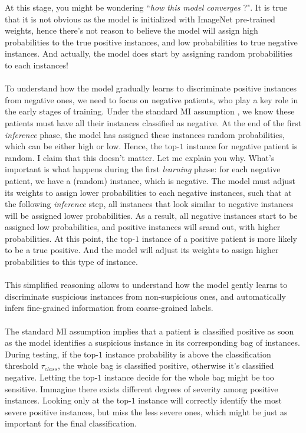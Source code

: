 \documentclass[final]{cvpr}
\begin{document}
	\noindent
	 At this stage, you might be wondering ``\textit{how this model converges} ?". It is true that it is not obvious as the model is initialized with ImageNet pre-trained weights, hence there's not reason to believe the model will assign high probabilities to the true positive instances, and low probabilities to true negative instances. And actually, the model does start by assigning random probabilities to each instances!  \\
	 \\
	 To understand how the model gradually learns to discriminate positive instances from negative ones, we need to focus on negative patients, who play a key role in the early stages of training. Under the standard MI assumption , we know these patients must have all their instances classified as negative. At the end of the first \textit{inference} phase, the model has assigned these instances random probabilities, which can be either high or low. Hence, the top-$1$ instance for negative patient is random. I claim that this doesn't matter. Let me explain you why. What's important is what happens during the first \textit{learning} phase: for each negative patient, we have a (random) instance, which is negative. The model must adjust its weights to assign lower probabilities to each negative instances, such that at the following \textit{inference} step, all instances that look similar to negative instances will be assigned lower probabilities. As a result, all negative instances start to be assigned low probabilities, and positive instances will srand out, with higher probabilities. At this point, the top-$1$ instance of a positive patient is more likely to be a true positive. And the model will adjust its weights to assign higher probabilities to this type of instance.\\
	 \\
	 This simplified reasoning allows to understand	how the model gently learns to discriminate suspicious instances from non-suspicious ones, and automatically infers fine-grained information from coarse-grained labels.\\
	 \\
	The standard MI assumption implies that a patient is classified positive as soon as the model identifies a suspicious instance in its corresponding bag of instances. During testing, if the top-$1$ instance probability is above the classification threshold $\tau_{class}$, the whole bag is classified positive, otherwise it's classified negative. Letting the top-$1$ instance decide for the whole bag might be too sensitive. Immagine there exists different degrees of severity among positive instances. Looking only at the top-$1$ instance will correctly identify the most severe positive instances, but miss the less severe ones, which might be just as important for the final classification. 
	
\end{document}
